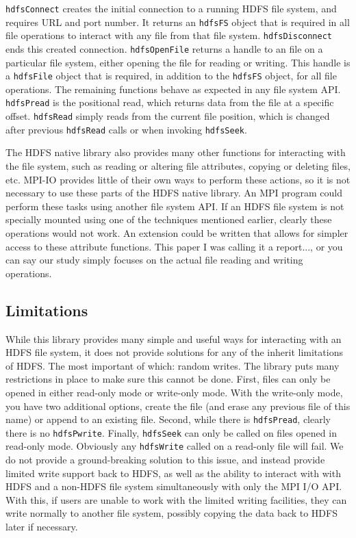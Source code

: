 \texttt{hdfsConnect} creates the initial connection to a running HDFS file
system, and requires URL and port number. It returns an \texttt{hdfsFS} object
that is required in all file operations to interact with any file from that file
system. \texttt{hdfsDisconnect} ends this created connection.
\texttt{hdfsOpenFile} returns a handle to an file on a particular file system,
either opening the file for reading or writing. This handle is a
\texttt{hdfsFile} object that is required, in addition to the \texttt{hdfsFS}
object, for all file operations. The remaining functions behave as expected in
any file system API. \texttt{hdfsPread} is the positional read, which returns
data from the file at a specific offset. \texttt{hdfsRead} simply reads from the
current file position, which is changed after previous \texttt{hdfsRead} calls
or when invoking \texttt{hdfsSeek}.

The HDFS native library also provides many other functions for interacting with
the file system, such as reading or altering file attributes, copying or
deleting files, etc. MPI-IO provides little of their own ways to perform these
actions, so it is not necessary to use these parts of the HDFS native library.
An MPI program could perform these tasks using another file system API. If an
HDFS file system is not specially mounted using one of the techniques mentioned
earlier, clearly these operations would not work. An extension could be written
that allows for simpler access to these attribute functions. This
paper{\color{red} I was calling it a report..., or you can say our study} simply
focuses on the actual file reading and writing operations.

\subsection{Limitations}
While this library provides many simple and useful ways for interacting with an
HDFS file system, it does not provide solutions for any of the inherit
limitations of HDFS. The most important of which: random writes. The library
puts many restrictions in place to make sure this cannot be done. First, files
can only be opened in either read-only mode or write-only mode. With the
write-only mode, you have two additional options, create the file (and erase any
previous file of this name) or append to an existing file. Second, while there
is \texttt{hdfsPread}, clearly there is no \texttt{hdfsPwrite}. Finally,
\texttt{hdfsSeek} can only be called on files opened in read-only mode.
Obviously any \texttt{hdfsWrite} called on a read-only file will fail. We do not
provide a ground-breaking solution to this issue, and instead provide limited
write support back to HDFS, as well as the ability to interact with with HDFS
and a non-HDFS file system simultaneously with only the MPI I/O API. With this,
if users are unable to work with the limited writing facilities, they can write
normally to another file system, possibly copying the data back to HDFS later if
necessary.

